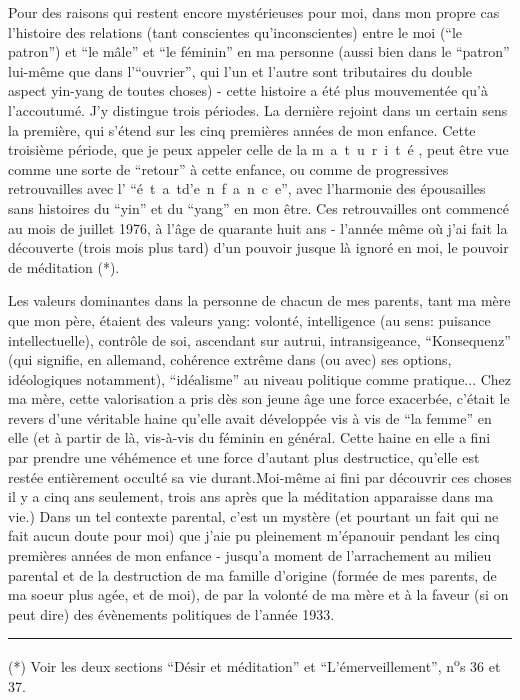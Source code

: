 

Pour des raisons qui restent encore mystérieuses pour moi, dans mon propre cas l'histoire des relations (tant conscientes qu'inconscientes) entre le moi (``le patron'')\handwritten{,} et ``le mâle'' et ``le féminin'' en ma personne (aussi bien dans le ``patron'' lui-même que dans l'``ouvrier'', qui l'un et l'autre sont tributaires du double aspect yin-yang de toutes choses) - cette histoire a été plus mouvementée qu'à l'accoutumé. J'y distingue trois périodes. La dernière rejoint dans un certain sens la première, qui s'étend sur les cinq premières années de mon enfance. Cette troisième période, que je peux appeler celle de la \mbox{m a t u r i t é} , peut être vue comme une sorte de ``retour'' à cette enfance, ou comme de progressives retrouvailles avec l' ``\mbox{é t a t\quad d'\quad e n f a n c e}'', avec l'harmonie des épousailles sans histoires du ``yin'' et du ``yang'' en mon être. Ces retrouvailles ont commencé au mois de juillet 1976, à l'âge de quarante huit ans - l'année même où j'ai fait la découverte (trois mois plus tard) d'un pouvoir jusque là ignoré en moi, le pouvoir de méditation (*).

Les valeurs dominantes dans la personne de chacun de mes parents, tant ma mère que mon père, étaient des valeurs yang: volonté, intelligence (au sens: puisance intellectuelle), contrôle de soi, ascendant sur autrui, intransigeance, ``Konsequenz'' (qui signifie, en allemand, cohérence extrême dans (ou avec) ses options, idéologiques notamment), ``idéalisme'' au niveau politique comme pratique... Chez ma mère, cette valorisation a pris dès son jeune âge une force exacerbée, c'était le revers d'une véritable haine qu'elle avait développée vis à vis de ``la femme'' en elle (et à partir de là, vis-à-vis du féminin en général\unsure{:}\handwritten{)}. Cette haine en elle a fini par prendre une véhémence et une force d'autant plus destructice, qu'elle est restée entièrement occulté sa vie durant.\handwritten{(}Moi-même ai fini par découvrir ces choses il y a cinq ans seulement, trois ans après que la méditation apparaisse dans ma vie.) Dans un tel contexte parental, c'est un mystère (et pourtant un fait qui ne fait aucun doute pour moi) que j'aie pu pleinement m'épanouir pendant les cinq premières années de mon enfance - jusqu'a moment de l'arrachement au milieu parental et de la destruction de ma famille d'origine (formée de mes parents, de ma soeur plus agée, et de moi), de par la volonté de ma mère et à la faveur (si on peut dire) des évènements politiques de l'année 1933.

\noindent\rule{.24\linewidth}{.35pt}\par
(*) Voir les deux sections ``Désir et méditation'' et ``L'émerveillement'', n\textsuperscript{o}s 36 et 37.

